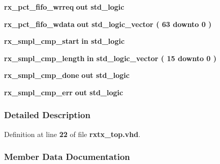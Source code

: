 \begin{DoxyCompactItemize}
\item 
{\bf rx\+\_\+pct\+\_\+fifo\+\_\+wrreq}  {\bfseries {\bfseries \textcolor{keywordflow}{out}\textcolor{vhdlchar}{ }}} {\bfseries \textcolor{comment}{std\+\_\+logic}\textcolor{vhdlchar}{ }} 
\item 
{\bf rx\+\_\+pct\+\_\+fifo\+\_\+wdata}  {\bfseries {\bfseries \textcolor{keywordflow}{out}\textcolor{vhdlchar}{ }}} {\bfseries \textcolor{comment}{std\+\_\+logic\+\_\+vector}\textcolor{vhdlchar}{ }\textcolor{vhdlchar}{(}\textcolor{vhdlchar}{ }\textcolor{vhdlchar}{ } \textcolor{vhdldigit}{63} \textcolor{vhdlchar}{ }\textcolor{keywordflow}{downto}\textcolor{vhdlchar}{ }\textcolor{vhdlchar}{ } \textcolor{vhdldigit}{0} \textcolor{vhdlchar}{ }\textcolor{vhdlchar}{)}\textcolor{vhdlchar}{ }} 
\item 
{\bf rx\+\_\+smpl\+\_\+cmp\+\_\+start}  {\bfseries {\bfseries \textcolor{keywordflow}{in}\textcolor{vhdlchar}{ }}} {\bfseries \textcolor{comment}{std\+\_\+logic}\textcolor{vhdlchar}{ }} 
\item 
{\bf rx\+\_\+smpl\+\_\+cmp\+\_\+length}  {\bfseries {\bfseries \textcolor{keywordflow}{in}\textcolor{vhdlchar}{ }}} {\bfseries \textcolor{comment}{std\+\_\+logic\+\_\+vector}\textcolor{vhdlchar}{ }\textcolor{vhdlchar}{(}\textcolor{vhdlchar}{ }\textcolor{vhdlchar}{ } \textcolor{vhdldigit}{15} \textcolor{vhdlchar}{ }\textcolor{keywordflow}{downto}\textcolor{vhdlchar}{ }\textcolor{vhdlchar}{ } \textcolor{vhdldigit}{0} \textcolor{vhdlchar}{ }\textcolor{vhdlchar}{)}\textcolor{vhdlchar}{ }} 
\item 
{\bf rx\+\_\+smpl\+\_\+cmp\+\_\+done}  {\bfseries {\bfseries \textcolor{keywordflow}{out}\textcolor{vhdlchar}{ }}} {\bfseries \textcolor{comment}{std\+\_\+logic}\textcolor{vhdlchar}{ }} 
\item 
{\bf rx\+\_\+smpl\+\_\+cmp\+\_\+err}  {\bfseries {\bfseries \textcolor{keywordflow}{out}\textcolor{vhdlchar}{ }}} {\bfseries \textcolor{comment}{std\+\_\+logic}\textcolor{vhdlchar}{ }} 
\end{DoxyCompactItemize}


\subsubsection{Detailed Description}


Definition at line {\bf 22} of file {\bf rxtx\+\_\+top.\+vhd}.



\subsubsection{Member Data Documentation}
